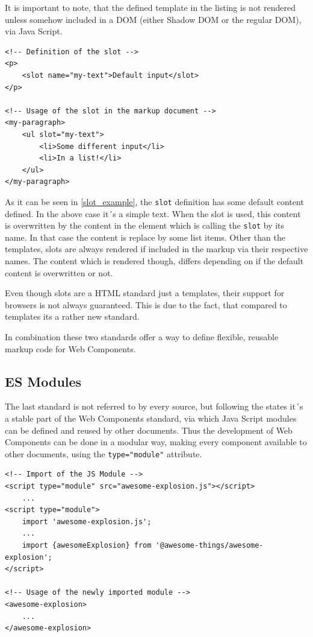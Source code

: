 It is important to note, that the defined template in the listing is not rendered unless somehow included in a DOM (either Shadow DOM or the regular DOM), via Java Script.

\begin{lstlisting}[language=HTML5, caption=Definition and usage of the \texttt{slot} standard \cite{wc_html_template_slots}, label=slot_example]
<!-- Definition of the slot -->
<p>
	<slot name="my-text">Default input</slot>
</p>

<!-- Usage of the slot in the markup document -->
<my-paragraph>
	<ul slot="my-text">
		<li>Some different input</li>
		<li>In a list!</li>
	</ul>
</my-paragraph>
\end{lstlisting}

As it can be seen in \ref{slot_example}, the \texttt{slot} definition has some default content defined. In the above case it´s a simple text. When the slot is used, this content is overwritten by the content in the element which is calling the \texttt{slot} by its name.
In that case the content is replace by some list items.
Other than the templates, slots are always rendered if included in the markup via their respective names. The content which is rendered though, differs depending on if the default content is overwritten or not.

Even though slots are a HTML standard just a templates, their support for browsers is not always guaranteed. This is due to the fact, that compared to templates its a rather new standard.

In combination these two standards offer a way to define flexible, reusable markup code for Web Components.\cite{wc_html_template_slots}

\subsection{ES Modules}

The last standard is not referred to by every source, but following the \cite{wc_specifications} states it´s a stable part of the Web Components standard, via which Java Script modules can be defined and reused by other documents.
Thus the development of Web Components can be done in a modular way, making every component available to other documents, using the \texttt{type="module"} attribute.

\begin{lstlisting}[language=HTML5, caption=Importing modular Java Script documents into antoher \cite{wc_specifications}, label=es_modules_example]
<!-- Import of the JS Module -->
<script type="module" src="awesome-explosion.js"></script>
	...
<script type="module">
	import 'awesome-explosion.js';
	...
	import {awesomeExplosion} from '@awesome-things/awesome-explosion';
</script>

<!-- Usage of the newly imported module -->
<awesome-explosion>
	...
</awesome-explosion>
\end{lstlisting}

